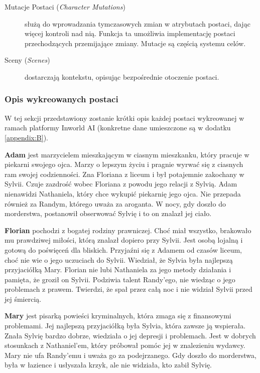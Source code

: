\begin{description}
    \item[Mutacje Postaci (\textit{Character Mutations})] służą do wprowadzania tymczasowych zmian w atrybutach
          postaci, dając więcej kontroli nad nią. Funkcja ta umożliwia implementację postaci przechodzących
          przemijające zmiany. Mutacje są częścią systemu celów\cite{inworld_docs}.

    \item[Sceny (\textit{Scenes})] dostarczają kontekstu, opisując bezpośrednie otoczenie postaci\cite{inworld_docs}.

\end{description}

\subsubsection*{Opis wykreowanych postaci}

W tej sekcji przedstawiony zostanie krótki opis każdej postaci wykreowanej w ramach platformy Inworld AI
(konkretne dane umieszczone są w dodatku \ref{appendix:B}).

\textbf{Adam} jest marzycielem mieszkającym w ciasnym mieszkanku, który pracuje w piekarni swojego ojca.
Marzy o lepszym życiu i pragnie wyrwać się z ciasnych ram swojej codzienności. Zna Floriana z liceum i był
potajemnie zakochany w Sylvii. Czuje zazdrość wobec Floriana z powodu jego relacji z Sylvią.
Adam nienawidzi Nathaniela, który chce wykupić piekarnię jego ojca. Nie przepada również za
Randym, którego uważa za aroganta. W nocy, gdy doszło do morderstwa, postanowił obserwować Sylvię
i to on znalazł jej ciało.

\textbf{Florian} pochodzi z bogatej rodziny prawniczej. Choć miał wszystko, brakowało mu prawdziwej miłości,
którą znalazł dopiero przy Sylvii. Jest osobą lojalną i gotową do poświęceń dla bliskich. Przyjaźni
się z Adamem od czasów liceum, choć nie wie o jego uczuciach do Sylvii. Wiedział, że Sylvia
była najlepszą przyjaciółką Mary. Florian nie lubi Nathaniela za jego metody działania i pamięta, że groził
on Sylvii. Podziwia talent Randy'ego, nie wiedząc o jego problemach z prawem. Twierdzi, że spał przez całą
noc i nie widział Sylvii przed jej śmiercią.

\textbf{Mary} jest pisarką powieści kryminalnych, która zmaga się z finansowymi problemami. Jej najlepszą
przyjaciółką była Sylvia, która zawsze ją wspierała. Znała Sylvię bardzo dobrze, wiedziała o jej
depresji i problemach. Jest w dobrych stosunkach z Nathaniel'em, który próbował pomóc jej w
znalezieniu wydawcy. Mary nie ufa Randy'emu i uważa go za podejrzanego. Gdy doszło do morderstwa,
była w łazience i usłyszała krzyk, ale nie widziała, kto zabił Sylvię.

